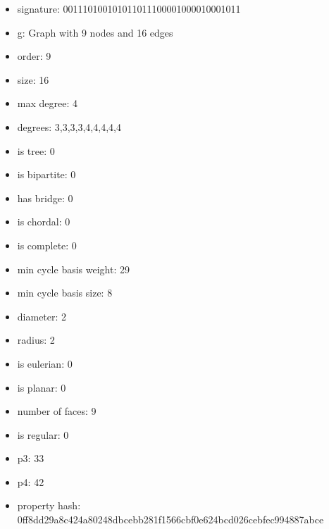 \newpage
\begin{figure}
\end{figure}
\begin{itemize}
\item signature: 001110100101011011100001000010001011
\item g: Graph with 9 nodes and 16 edges
\item order: 9
\item size: 16
\item max degree: 4
\item degrees: 3,3,3,3,4,4,4,4,4
\item is tree: 0
\item is bipartite: 0
\item has bridge: 0
\item is chordal: 0
\item is complete: 0
\item min cycle basis weight: 29
\item min cycle basis size: 8
\item diameter: 2
\item radius: 2
\item is eulerian: 0
\item is planar: 0
\item number of faces: 9
\item is regular: 0
\item p3: 33
\item p4: 42
\item property hash: 0ff8dd29a8c424a80248dbcebb281f1566cbf0e624bcd026cebfec994887abce
\end{itemize}
